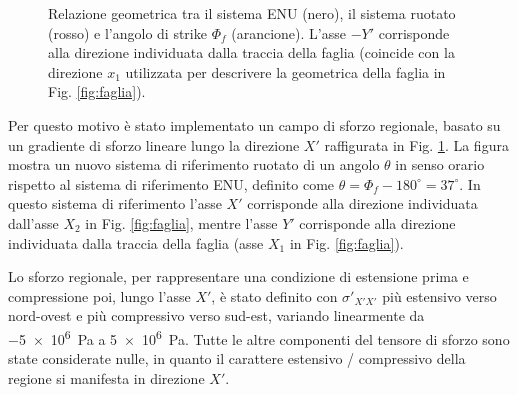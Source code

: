 \begin{figure}[!b]
    \centering
    \caption{Relazione geometrica tra il sistema ENU (nero), il sistema ruotato (rosso) e l'angolo di strike $\Phi_f$ (arancione). L'asse $-Y'$ corrisponde alla direzione individuata dalla traccia della faglia (coincide con la direzione \(x_1\) utilizzata per descrivere la geometrica della faglia in Fig. \ref{fig:faglia}).}
    \label{fig:assi_strike}
\end{figure}

Per questo motivo è stato implementato un campo di sforzo regionale, basato su un gradiente di sforzo lineare lungo la direzione \(X'\) raffigurata in Fig. \ref{fig:assi_strike}. La figura mostra un nuovo sistema di riferimento ruotato di un angolo \(\theta\) in senso orario rispetto al sistema di riferimento ENU, definito come \(\theta = \Phi_f - 180^\circ = 37^\circ\). In questo sistema di riferimento l'asse \(X'\) corrisponde alla direzione individuata dall'asse \(X_2\) in Fig. \ref{fig:faglia}, mentre l'asse \(Y'\) corrisponde alla direzione individuata dalla traccia della faglia (asse \(X_1\) in Fig. \ref{fig:faglia}).

Lo sforzo regionale, per rappresentare una condizione di estensione prima e compressione poi, lungo l'asse \(X'\), è stato definito con \(\sigma'_{X'X'}\) più estensivo verso nord-ovest e più compressivo verso sud-est, variando linearmente da \qty{-5e6}{\pascal} a \qty{5e6}{\pascal}. Tutte le altre componenti del tensore di sforzo sono state considerate nulle, in quanto il carattere estensivo / compressivo della regione si manifesta in direzione \(X'\).

